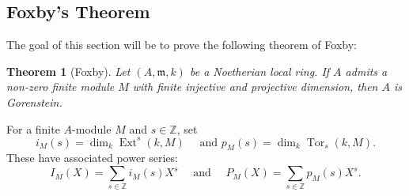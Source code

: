 \documentclass[11pt]{article}
\theoremstyle{thmstyle}
\newtheorem{theorem}{Theorem}
\theoremstyle{defstyle}
\newcommand{\Z}{\mathbb{Z}}
\newcommand{\Tor}{\operatorname{Tor}}
\newcommand{\frakm}{\mathfrak{m}} %
\newcommand{\Ext}{\operatorname{Ext}}
\begin{document}
\subsection*{Foxby's Theorem}

The goal of this section will be to prove the following theorem of Foxby:

\begin{theorem}[Foxby]
    Let $(A,\frakm, k)$ be a Noetherian local ring. If $A$ admits a non-zero finite module $M$ with finite injective and projective dimension, then $A$ is Gorenstein.
\end{theorem}

For a finite $A$-module $M$ and $s\in\Z$, set
\begin{equation*}
    i_M(s) = \dim_k \Ext^s(k, M)\quad\text{ and } p_M(s) = \dim_k \Tor_s(k, M).
\end{equation*}
These have associated power series: 
\begin{equation*}
    I_M(X) = \sum_{s\in\Z} i_M(s)X^s\quad\text{ and }\quad P_M(X) = \sum_{s\in\Z} p_M(s)X^s.
\end{equation*}
\end{document}
